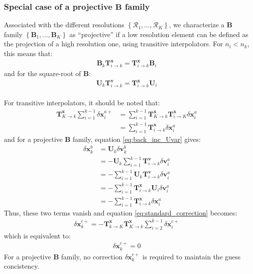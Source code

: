 \documentclass[12pt]{scrartcl}
\begin{document}
\subsubsection{Special case of a projective $\mathbf{B}$ family}
Associated with the different resolutions $\left\{\mathcal{R}_1,\dots,\mathcal{R}_K\right\}$, we characterize a $\mathbf{B}$ family $\left\{\mathbf{B}_1, \dots, \mathbf{B}_K\right\}$ as ``projective'' if a low resolution element can be defined as the projection of a high resolution one, using transitive interpolators. For $n_i < n_k$, this means that:
\begin{align}
\label{eq:projective_definition_B}
\mathbf{B}_k \mathbf{T}^\mathbf{x}_{i \rightarrow k} = \mathbf{T}^\mathbf{x}_{i \rightarrow k} \mathbf{B}_i
\end{align}
and for the square-root of $\mathbf{B}$:
\begin{align}
\label{eq:projective_definition_U}
\mathbf{U}_k \mathbf{T}^\mathbf{v}_{i \rightarrow k} = \mathbf{T}^\mathbf{x}_{i \rightarrow k} \mathbf{U}_i
\end{align}
$  $\\
For transitive interpolators, it should be noted that:
\begin{align}
\mathbf{T}^\mathbf{x}_{K \rightarrow k} \sum_{i=1}^{k-1} \delta \mathbf{x}^{a+}_i & = \sum_{i=1}^{k-1} \mathbf{T}^\mathbf{x}_{K \rightarrow k} \mathbf{T}^\mathbf{x}_{i \rightarrow K} \delta \mathbf{x}^a_i \nonumber \\
& = \sum_{i=1}^{k-1} \mathbf{T}^\mathbf{x}_{i \rightarrow k} \delta \mathbf{x}^a_i
\end{align}
and for a projective $\mathbf{B}$ family, equation \eqref{eq:back_inc_Uvar} gives:
\begin{align}
\delta \mathbf{x}^b_k & = \mathbf{U}_k \delta \mathbf{v}^b_k \nonumber \\
& = - \mathbf{U}_k \sum_{i=1}^{k-1} \mathbf{T}^\mathbf{v}_{i \rightarrow k} \delta \mathbf{v}^a_i \nonumber \\
& = - \sum_{i=1}^{k-1} \mathbf{U}_k \mathbf{T}^\mathbf{v}_{i \rightarrow k} \delta \mathbf{v}^a_i \nonumber \\
& = - \sum_{i=1}^{k-1} \mathbf{T}^\mathbf{x}_{i \rightarrow k} \mathbf{U}_i \delta \mathbf{v}^a_i \nonumber \\
& = - \sum_{i=1}^{k-1} \mathbf{T}^\mathbf{x}_{i \rightarrow k} \delta \mathbf{x}^a_i
\end{align}
Thus, these two terms vanish and equation \eqref{eq:standard_correction} becomes:
\begin{align}
\delta \mathbf{x}^{c+}_k = - \mathbf{T}^\mathbf{x}_{k \rightarrow K} \mathbf{T}^\mathbf{x}_{K \rightarrow k}  \sum_{i=2}^{k-1} \delta \mathbf{x}^{c+}_i
\end{align}
which is equivalent to:
\begin{align}
\label{eq:standard_no_correction}
\boxed{\delta \mathbf{x}^{c+}_k = 0}
\end{align}
For a projective $\mathbf{B}$ family, no correction $\delta \mathbf{x}^{c+}_k$ is required to maintain the guess concistency.
\end{document}
